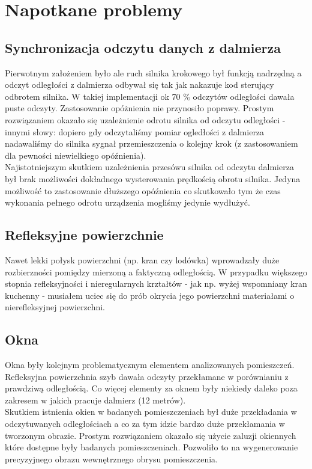 \section {Napotkane problemy}
\subsection {Synchronizacja odczytu danych z dalmierza}
Pierwotnym założeniem było ale ruch silnika krokowego był funkcją nadrzędną a odczyt odległości z dalmierza odbywał się tak jak nakazuje kod sterujący odbrotem silnika. W takiej implementacji ok 70 \% odczytów odległości dawała puste odczyty. Zastosowanie opóżnienia nie przynosiło poprawy. Prostym rozwiązaniem okazało się uzależnienie odrotu silnika od odczytu odległości - innymi słowy: dopiero gdy odczytaliśmy pomiar ogledłości z dalmierza nadawaliśmy do silnika sygnał przemieszczenia o kolejny krok (z zastosowaniem dla pewności niewielkiego opóźnienia).\\

Najistotniejszym skutkiem uzależnienia przesówu silnika od odczytu dalmierza był brak możliwości dokładnego wysterowania prędkością obrotu silnika. Jedyna możliwość to zastosowanie dłuższego opóźnienia co skutkowało tym że czas wykonania pełnego odrotu urządzenia mogliśmy jedynie wydłużyć. 

\subsection {Refleksyjne powierzchnie}
Nawet lekki połysk powierzchni (np. kran czy lodówka) wprowadzały duże rozbierzności pomiędzy mierzoną a faktyczną odległością. W przypadku większego stopnia refleksyjności i nieregularnych krztałtów - jak np. wyżej wspomniany kran kuchenny - musiałem uciec się do prób okrycia jego powierzchni materiałami o nierefleksyjnej powierzchni.

\subsection {Okna}
Okna były kolejnym problematycznym elementem analizowanych pomieszczeń. Refleksyjna powierzchnia szyb dawała odczyty przekłamane w porównianiu z prawdziwą odległością. Co więcej elementy za oknem były niekiedy daleko poza zakresem w jakich pracuje dalmierz (12 metrów).\\

Skutkiem istnienia okien w badanych pomieszczeniach był duże przekładania w odczytuwanych odległościach a co za tym idzie bardzo duże przekłamania w tworzonym obrazie. Prostym rozwiązaniem okazało się użycie zaluzji okiennych które dostępne były badanych pomieszczeniach. Pozwoliło to na wygenerowanie precyzyjnego obrazu wewnętrznego obrysu pomieszczenia.

